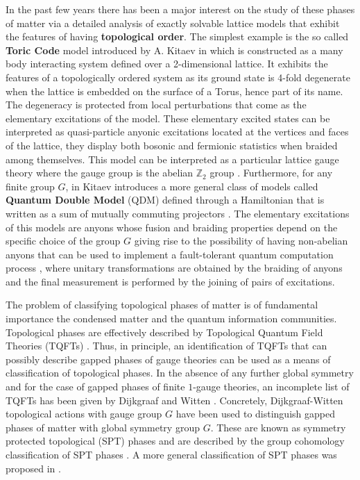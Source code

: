 \documentclass[titlepage,11pt]{article}
\theoremstyle{plain}%
\theoremstyle{definition}
\theoremstyle{remark}
\begin{document}
In the past few years there has been a major interest on the study of these phases of matter via a detailed analysis of exactly solvable lattice models that exhibit the features of having \textbf{topological order}. The simplest example is the so called \textbf{Toric Code} model introduced by A. Kitaev in \cite{Kitaev2} which is constructed as a many body interacting system defined over a 2-dimensional lattice. It exhibits the features of a topologically ordered system as its ground state is 4-fold degenerate when the lattice is embedded on the surface of a Torus, hence part of its name. The degeneracy is protected from local perturbations that come as the elementary excitations of the model. These elementary excited states can be interpreted as quasi-particle anyonic excitations located at the vertices and faces of the lattice, they display both bosonic and fermionic statistics when braided among themselves. This model can be interpreted as a particular lattice gauge theory \cite{Kogut} where the gauge group is the abelian $\mathbb{Z}_2$  group \cite{Kitaev2}. Furthermore, for any finite group $G$, in \cite{Kitaev2} Kitaev introduces a more general class of models called \textbf{Quantum Double Model} (QDM)  defined through a Hamiltonian that is written as a sum of mutually commuting projectors \cite{Drinfeld,majid2000,dijkgraaf,Propitius}. The elementary excitations of this models are anyons whose fusion and braiding properties depend on the specific choice of the group $G$ giving rise to the possibility of having non-abelian anyons that can be used to implement a fault-tolerant quantum computation process \cite{kauffman,collins,preskill,pachos}, where unitary transformations are obtained by the braiding of anyons and the final measurement is performed by the joining of pairs of excitations. 

The problem of classifying topological phases of matter is of fundamental importance the condensed matter and the quantum information communities. Topological phases are effectively described by Topological Quantum Field Theories (TQFTs) \cite{Witten,Atiyah88}. Thus, in principle, an identification of TQFTs that can possibly describe gapped phases of gauge theories can be used as a means of classification of topological phases. In the absence of any further global symmetry and for the case of gapped phases of finite $1$-gauge theories, an incomplete list of TQFTs has been given by Dijkgraaf and Witten \cite{Witten,Dijkgraaf90}. Concretely, Dijkgraaf-Witten topological actions with gauge group $G$ have been used to distinguish gapped phases of matter with global symmetry group $G$. These are known as symmetry protected topological (SPT) phases \cite{Wen-Gu09,Chen12,Oshikawa10,Oshikawa12,Fidkowsky11,LevinGu} and are described by the group cohomology classification of SPT phases \cite{Chen-Wen13}. A more general classification of SPT phases was proposed in \cite{Kapustin14}. 
\end{document}
